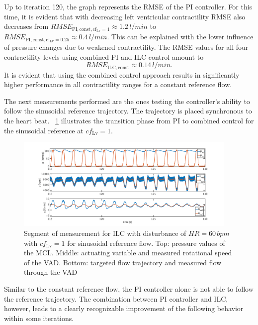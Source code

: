Up to iteration 120, the graph represents the RMSE of the PI controller. For this time, it is evident that with decreasing left ventricular contractility RMSE also decreases from $RMSE_{\mathrm{PI,const,cf_{Lv}=1}}\approx 1.2\, l/min$ to $RMSE_{\mathrm{PI,const,cf_{Lv}=0.25}}\approx 0.4\, l/min$. This can be explained with the lower influence of pressure changes due to weakened contractility. The RMSE values for all four contractility levels using combined PI and ILC control amount to
\begin{equation}
  RMSE_{\mathrm{ILC,const}}\approx0.14\,l/min.
\end{equation}
It is evident that using the combined control approach results in significantly higher performance in all contractility ranges for a constant reference flow.

The next measurements performed are the ones testing the controller's ability to follow the sinusoidal reference trajectory. The trajectory is placed synchronous to the heart beat. \figurename~\ref{fig:pi_to_ilc_dist_sine_cf1} illustrates the transition phase from PI to combined control for the sinusoidal reference at $cf_{\mathrm{Lv}}=1$.
\begin{figure}[ht!]
  \centering
  \includegraphics[width=0.95\textwidth]{images/chapt_5/ILC/pi_to_ilc_dist_sine_cf1.pdf}
  \caption[Segment of measurement for ILC with disturbance of $HR=60\,bpm$ with $cf_{\mathrm{Lv}}=1$ for sinusoidal reference flow]{Segment of measurement for ILC with disturbance of $HR=60\,bpm$ with $cf_{\mathrm{Lv}}=1$ for sinusoidal reference flow. Top:  pressure values of the MCL. Middle: actuating variable and measured rotational speed of the VAD. Bottom: targeted flow trajectory and measured flow through the VAD}
  \label{fig:pi_to_ilc_dist_sine_cf1}
\end{figure}
Similar to the constant reference flow, the PI controller alone is not able to follow the reference trajectory. The combination between PI controller and ILC, however, leads to a clearly recognizable improvement of the following behavior within some iterations.
